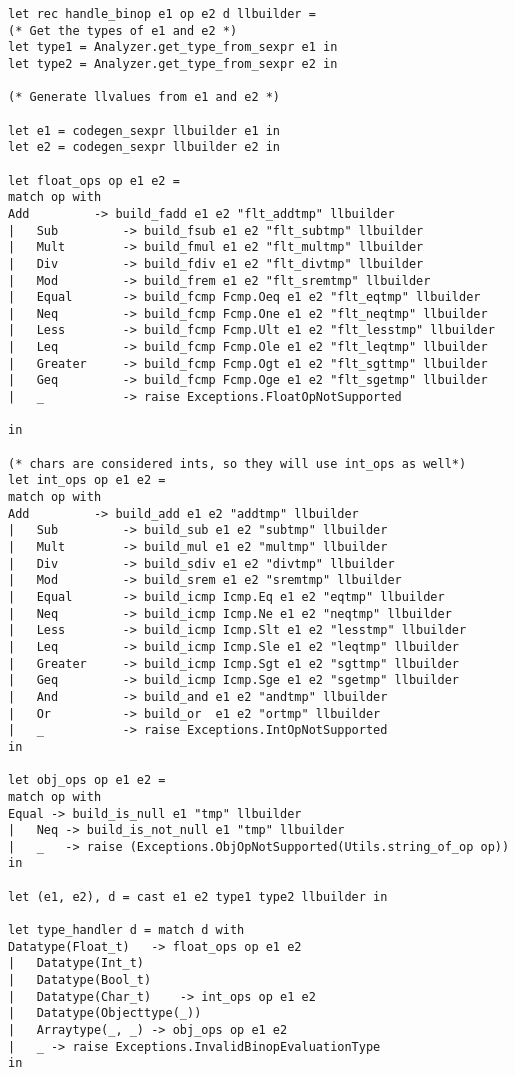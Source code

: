 \begin{verbatim}
let rec handle_binop e1 op e2 d llbuilder =
(* Get the types of e1 and e2 *) 
let type1 = Analyzer.get_type_from_sexpr e1 in
let type2 = Analyzer.get_type_from_sexpr e2 in

(* Generate llvalues from e1 and e2 *)

let e1 = codegen_sexpr llbuilder e1 in
let e2 = codegen_sexpr llbuilder e2 in

let float_ops op e1 e2 =
match op with
Add 		-> build_fadd e1 e2 "flt_addtmp" llbuilder
| 	Sub 		-> build_fsub e1 e2 "flt_subtmp" llbuilder
| 	Mult 		-> build_fmul e1 e2 "flt_multmp" llbuilder
| 	Div 		-> build_fdiv e1 e2 "flt_divtmp" llbuilder
| 	Mod 		-> build_frem e1 e2 "flt_sremtmp" llbuilder
| 	Equal 		-> build_fcmp Fcmp.Oeq e1 e2 "flt_eqtmp" llbuilder
| 	Neq 		-> build_fcmp Fcmp.One e1 e2 "flt_neqtmp" llbuilder
| 	Less 		-> build_fcmp Fcmp.Ult e1 e2 "flt_lesstmp" llbuilder
| 	Leq 		-> build_fcmp Fcmp.Ole e1 e2 "flt_leqtmp" llbuilder
| 	Greater		-> build_fcmp Fcmp.Ogt e1 e2 "flt_sgttmp" llbuilder
| 	Geq 		-> build_fcmp Fcmp.Oge e1 e2 "flt_sgetmp" llbuilder
| 	_ 			-> raise Exceptions.FloatOpNotSupported 

in 

(* chars are considered ints, so they will use int_ops as well*)
let int_ops op e1 e2 = 
match op with
Add 		-> build_add e1 e2 "addtmp" llbuilder
| 	Sub 		-> build_sub e1 e2 "subtmp" llbuilder
| 	Mult 		-> build_mul e1 e2 "multmp" llbuilder
| 	Div 		-> build_sdiv e1 e2 "divtmp" llbuilder
| 	Mod 		-> build_srem e1 e2 "sremtmp" llbuilder
| 	Equal 		-> build_icmp Icmp.Eq e1 e2 "eqtmp" llbuilder
| 	Neq 		-> build_icmp Icmp.Ne e1 e2 "neqtmp" llbuilder
| 	Less 		-> build_icmp Icmp.Slt e1 e2 "lesstmp" llbuilder
| 	Leq 		-> build_icmp Icmp.Sle e1 e2 "leqtmp" llbuilder
| 	Greater		-> build_icmp Icmp.Sgt e1 e2 "sgttmp" llbuilder
| 	Geq 		-> build_icmp Icmp.Sge e1 e2 "sgetmp" llbuilder
| 	And 		-> build_and e1 e2 "andtmp" llbuilder
| 	Or 			-> build_or  e1 e2 "ortmp" llbuilder
| 	_ 			-> raise Exceptions.IntOpNotSupported 
in 

let obj_ops op e1 e2 = 
match op with
Equal -> build_is_null e1 "tmp" llbuilder 
| 	Neq -> build_is_not_null e1 "tmp" llbuilder 
| 	_ 	-> raise (Exceptions.ObjOpNotSupported(Utils.string_of_op op))
in

let (e1, e2), d = cast e1 e2 type1 type2 llbuilder in

let type_handler d = match d with
Datatype(Float_t)   -> float_ops op e1 e2
|	Datatype(Int_t)	
|   Datatype(Bool_t)
| 	Datatype(Char_t) 	-> int_ops op e1 e2
| 	Datatype(Objecttype(_))
| 	Arraytype(_, _) -> obj_ops op e1 e2
|   _ -> raise Exceptions.InvalidBinopEvaluationType
in


\end{verbatim}
